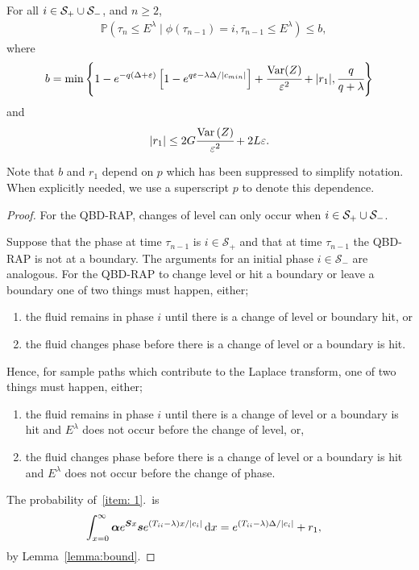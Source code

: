 \begin{lem}\label{lem: another bound}
	For all \(i\in\mathcal S_+\cup \mathcal{S}_-\), and \(n\geq 2\),
	\begin{align}
		&\mathbb P(\tau_n\leq E^\lambda \mid \phi(\tau_{n-1})=i, \tau_{n-1}\leq  E^\lambda ) \leq b,
	\end{align}
	where 
	\[b = \min\left\{1-e^{-q(\Delta+\varepsilon)}\left[1-e^{q\varepsilon-\lambda \Delta/|c_{min}|}\right] + \cfrac{\mathrm{Var}(Z)}{\varepsilon^2} + |r_1|,\cfrac{q}{q+\lambda}\right\}\]
	and  
	\[|r_1|\leq 2G\cfrac{\mathrm{Var} \left(Z\right)}{\varepsilon^2} + 2L\varepsilon.\]
\end{lem}
Note that \(b\) and \(r_1\) depend on \(p\) which has been suppressed to simplify notation. When explicitly needed, we use a superscript \(p\) to denote this dependence.  
\begin{proof}
	For the QBD-RAP, changes of level can only occur when \(i\in\mathcal S_+\cup\mathcal{S}_-\). 
	
	Suppose that the phase at time \(\tau_{n-1}\) is \(i\in\mathcal S_+\) and that at time \(\tau_{n-1}\) the QBD-RAP is not at a boundary. The arguments for an initial phase \(i\in\mathcal S_-\) are analogous. For the QBD-RAP to change level or hit a boundary or leave a boundary one of two things must happen, either; 
	\begin{enumerate}
		\item the fluid remains in phase \(i\) until there is a change of level or boundary hit, or
		\item the fluid changes phase before there is a change of level or a boundary is hit. 
	\end{enumerate}
	
	Hence, for sample paths which contribute to the Laplace transform, one of two things must happen, either; 
	\begin{enumerate}
		\item the fluid remains in phase \(i\) until there is a change of level or a boundary is hit and \(E^\lambda\) does not occur before the change of level, or, \label{item: 1}
		\item the fluid changes phase before there is a change of level or a boundary is hit and \(E^\lambda\) does not occur before the change of phase. \label{item: 2}
	\end{enumerate}
	
	The probability of~\ref{item: 1}.~is 
	\begin{align}
		\int_{x=0}^\infty \boldsymbol \alpha e^{\boldsymbol{S}x}\boldsymbol s e^{(T_{ii}-\lambda)x/|c_i|}\, \mathrm{d} x 
		&= e^{(T_{ii}-\lambda)\Delta/|c_i|} + r_1,\label{eqn: bnd this 12345}
	\end{align}
	by Lemma~\ref{lemma:bound}.
	

\end{proof}
